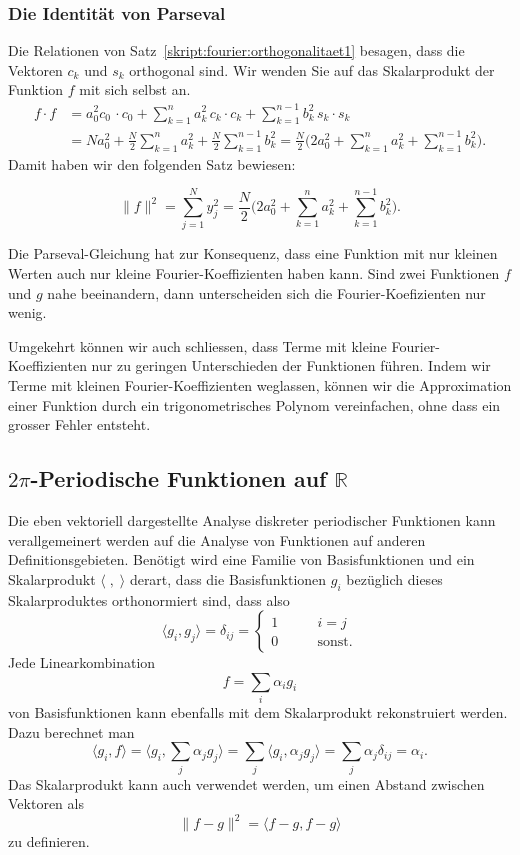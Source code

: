 \subsubsection{Die Identität von Parseval}
Die Relationen von
Satz~\ref{skript:fourier:orthogonalitaet1}
besagen, dass die Vektoren $c_k$ und $s_k$ orthogonal sind.
Wir wenden Sie auf das Skalarprodukt der Funktion $f$ mit sich selbst an.
\begin{align*}
f\cdot f
&=
a_0^2 c_0\,\cdot c_0
+
\sum_{k=1}^na_k^2 \,c_k\cdot c_k
+
\sum_{k=1}^{n-1} b_k^2\,s_k\cdot s_k
\\
&=
Na_0^2
+
\frac{N}2\sum_{k=1}^n a_k^2
+
\frac{N}2\sum_{k=1}^{n-1} b_k^2
=
\frac{N}2
\biggl(
2a_0^2
+
\sum_{k=1}^n a_k^2
+
\sum_{k=1}^{n-1} b_k^2
\biggr).
\end{align*}
Damit haben wir den folgenden Satz bewiesen:
\begin{satz}[Parseval]
\[
\|f\|^2
=
\sum_{j=1}^N y_j^2
=
\frac{N}2
\biggl(
2a_0^2
+
\sum_{k=1}^n a_k^2
+
\sum_{k=1}^{n-1} b_k^2
\biggr).
\]
\end{satz}
Die Parseval-Gleichung hat zur Konsequenz, dass eine Funktion mit nur
kleinen Werten auch nur kleine Fourier-Koeffizienten haben kann.
Sind zwei Funktionen $f$ und $g$ nahe beeinandern, dann unterscheiden
sich die Fourier-Koefizienten nur wenig.

Umgekehrt können wir auch schliessen, dass Terme mit kleine
Fourier-Koeffizienten nur zu geringen Unterschieden der Funktionen
führen.
Indem wir Terme mit kleinen Fourier-Koeffizienten weglassen, 
können wir die Approximation einer Funktion durch ein trigonometrisches
Polynom vereinfachen, ohne dass ein grosser Fehler entsteht.

\subsection{$2\pi$-Periodische Funktionen auf $\mathbb R$\label{subsection:fourier:stetig}}
Die eben vektoriell dargestellte Analyse diskreter periodischer Funktionen 
kann verallgemeinert werden auf die Analyse von Funktionen auf
anderen Definitionsgebieten.
Benötigt wird eine Familie von Basisfunktionen und ein Skalarprodukt
$\langle\;,\;\rangle$ derart, dass die Basisfunktionen $g_i$ bezüglich
dieses Skalarproduktes orthonormiert sind, dass also
\[
\langle g_i,g_j\rangle
=
\delta_{ij}
=
\begin{cases}
1&\qquad i=j\\
0&\qquad\text{sonst}.
\end{cases}
\]
Jede Linearkombination
\[
f = \sum_{i} \alpha_i g_i
\]
von Basisfunktionen kann ebenfalls mit dem Skalarprodukt rekonstruiert
werden.
Dazu berechnet man
\[
\langle g_i,f\rangle
=
\biggl\langle
g_i,\sum_j\alpha_jg_j
\biggr\rangle
=
\sum_j \langle g_i,\alpha_jg_j\rangle
=
\sum_j \alpha_j\delta_{ij}
=
\alpha_i.
\]
Das Skalarprodukt kann auch verwendet werden, um einen Abstand zwischen
Vektoren als
\[
\| f-g\|^2
=
\langle f-g,f-g\rangle
\]
zu definieren.

